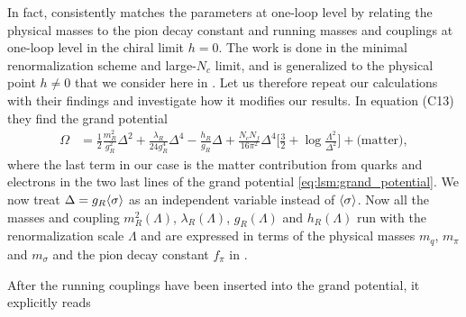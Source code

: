 In fact, \cite{ref:jo_lsm_consistent_chiral} consistently matches the parameters at one-loop level by relating the physical masses to the pion decay constant and running masses and couplings at one-loop level in the chiral limit $h=0$.
The work is done in the minimal renormalization scheme and large-$N_c$ limit, and is generalized to the physical point $h \neq 0$ that we consider here in \cite{ref:jo_lsm_consistent_physical}.
Let us therefore repeat our calculations with their findings and investigate how it modifies our results.
In equation (C13) they find the grand potential
\begin{equation}
\begin{split}
	\Omega &= \frac12 \frac{m_R^2}{g_R^2} \Delta^2 + \frac{\lambda_R}{24 g_R^4} \Delta^4 - \frac{h_R}{g_R} \Delta + \frac{N_c N_f}{16 \pi^2} \Delta^4 \bigg[ \frac32 + \log \frac{\Lambda^2}{\Delta^2} \bigg] + \text{(matter)},
\end{split}
\end{equation}
where the last term in our case is the matter contribution from quarks and electrons in the two last lines of the grand potential \eqref{eq:lsm:grand_potential}.
We now treat $\Delta = g_R \langle \sigma \rangle$ as an independent variable instead of $\langle \sigma \rangle$.
Now all the masses and coupling $m_R^2(\Lambda)$, $\lambda_R(\Lambda)$, $g_R(\Lambda)$ and $h_R(\Lambda)$ run with the renormalization scale $\Lambda$ and are expressed in terms of the physical masses $m_q$, $m_\pi$ and $m_\sigma$ and the pion decay constant $f_\pi$ in \cite[equation (B38)--(B39)]{ref:jo_lsm_consistent_physical}.
\iffalse
\begin{equation}
\begin{aligned}
	m_R^2(\Lambda) &= \frac{m_R^2(\Lambda_0)}{1 - \frac{4 g_0^2 N_c}{(4\pi)^2} \log \frac{\Lambda^2}{\Lambda_0^2}}, \qquad & 
	\lambda_R(\Lambda) &= \frac{\lambda_R(0) - \frac{48 g_0^4 N_c}{(4\pi)^2} \log \frac{\Lambda^2}{\Lambda_0^2} }{\Big(1 - \frac{4 g_0^2 N_c}{(4\pi)^2} \log \frac{\Lambda^2}{\Lambda_0^2}\Big)^2}, \\
	g_R^2(\Lambda) &= \frac{g_R^2(0)}{1 - \frac{4 g_0^2 N_c}{(4\pi)^2} \log \frac{\Lambda^2}{\Lambda_0^2}}, \qquad & 
	h_R(\Lambda) &= \frac{h_R(0)}{1 - \frac{2 g_0^2 N_c}{(4\pi)^2} \log \frac{\Lambda^2}{\Lambda_0^2}} .
\end{aligned}
\end{equation}
\fi
After the running couplings have been inserted into the grand potential, it explicitly reads
